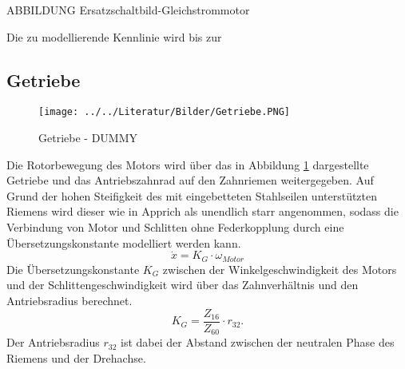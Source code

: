 ABBILDUNG Ersatzschaltbild-Gleichstrommotor

Die zu modellierende Kennlinie wird bis zur 

\subsection{Getriebe}

\begin{figure}[h]
	\centering
		\texttt{[image: ../../Literatur/Bilder/Getriebe.PNG]}
	\caption{Getriebe \cite{franke} - DUMMY}
	\label{fig:Getriebe}
\end{figure}

Die Rotorbewegung des Motors wird über das in Abbildung \ref{fig:Getriebe} dargestellte Getriebe und das Antriebszahnrad auf den Zahnriemen weitergegeben. Auf Grund der hohen Steifigkeit des mit eingebetteten Stahlseilen unterstützten Riemens wird dieser wie in Apprich \cite{apprich} als unendlich starr angenommen, sodass die Verbindung von Motor und Schlitten ohne Federkopplung durch eine Übersetzungskonstante modelliert werden kann.
\[
	\dot{x} = K_G \cdot \omega_{Motor}
\]
 Die Übersetzungskonstante $K_G$ zwischen der Winkelgeschwindigkeit des Motors und der Schlittengeschwindigkeit wird über das Zahnverhältnis und den Antriebsradius berechnet.
\[
	K_G =  \frac{Z_{16}}{Z_{60}} \cdot r_{32} .
\]
Der Antriebsradius $r_{32}$ ist dabei der Abstand zwischen der neutralen Phase des Riemens und der Drehachse.